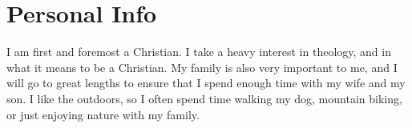 \documentclass[a4paper]{twentysecondcv} %
\begin{document}
\section{Personal Info}

I am first and foremost a Christian. I take a heavy interest in theology, and in what it means to be a Christian.
My family is also very important to me, and I will go to great lengths to ensure that I spend enough time with my wife and my son.
I like the outdoors, so I often spend time walking my dog, mountain biking, or just enjoying nature with my family.
\end{document}
